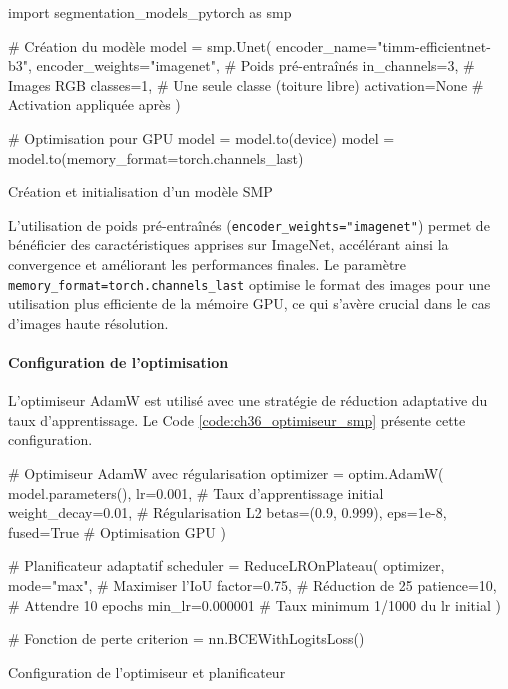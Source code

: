 \begin{code}[H]
    \begin{pythoncode}
        import segmentation_models_pytorch as smp

        # Création du modèle
        model = smp.Unet(
            encoder_name="timm-efficientnet-b3",
            encoder_weights="imagenet",  # Poids pré-entraînés
            in_channels=3,               # Images RGB
            classes=1,                   # Une seule classe (toiture libre)
            activation=None              # Activation appliquée après
        )
        
        # Optimisation pour GPU
        model = model.to(device)
        model = model.to(memory_format=torch.channels_last)
    \end{pythoncode}
    \caption{Création et initialisation d'un modèle SMP}
    \label{code:ch36_creation_modele_smp}
\end{code}

L'utilisation de poids pré-entraînés (\texttt{encoder\_weights="imagenet"}) permet de bénéficier des caractéristiques apprises sur ImageNet, accélérant ainsi la convergence et améliorant les performances finales. Le paramètre \texttt{memory\_format=torch.channels\_last} \cite{noauthor_beta_nodate} optimise le format des images pour une utilisation plus efficiente de la mémoire GPU, ce qui s'avère crucial dans le cas d'images haute résolution.

\paragraph{Configuration de l'optimisation}
L'optimiseur AdamW est utilisé avec une stratégie de réduction adaptative du taux d'apprentissage. Le Code \ref{code:ch36_optimiseur_smp} présente cette configuration.

\begin{code}[H]
    \begin{pythoncode}
    # Optimiseur AdamW avec régularisation
    optimizer = optim.AdamW(
        model.parameters(),
        lr=0.001,                    # Taux d'apprentissage initial
        weight_decay=0.01,           # Régularisation L2
        betas=(0.9, 0.999),
        eps=1e-8,
        fused=True                   # Optimisation GPU
    )
    
    # Planificateur adaptatif
    scheduler = ReduceLROnPlateau(
        optimizer,
        mode="max",                  # Maximiser l'IoU
        factor=0.75,                 # Réduction de 25%
        patience=10,                 # Attendre 10 epochs
        min_lr=0.000001             # Taux minimum 1/1000 du lr initial
    )
    
    # Fonction de perte
    criterion = nn.BCEWithLogitsLoss()
    \end{pythoncode}
    \caption{Configuration de l'optimiseur et planificateur}
    \label{code:ch36_optimiseur_smp}
\end{code}

